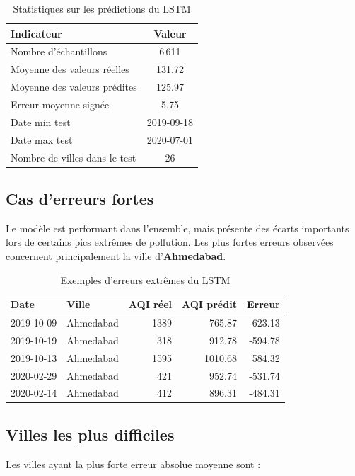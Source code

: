 \documentclass[11pt,a4paper]{article}
\begin{document}
\begin{table}[H]
\centering
\caption{Statistiques sur les prédictions du LSTM}
\begin{tabular}{lc}
\toprule
\textbf{Indicateur} & \textbf{Valeur} \\
\midrule
Nombre d'échantillons & 6\,611 \\
Moyenne des valeurs réelles & 131.72 \\
Moyenne des valeurs prédites & 125.97 \\
Erreur moyenne signée & 5.75 \\
Date min test & 2019-09-18 \\
Date max test & 2020-07-01 \\
Nombre de villes dans le test & 26 \\
\bottomrule
\end{tabular}
\end{table}

\subsection{Cas d'erreurs fortes}
Le modèle est performant dans l'ensemble, mais présente des écarts importants lors de certains pics extrêmes de pollution.
Les plus fortes erreurs observées concernent principalement la ville d'\textbf{Ahmedabad}.

\begin{table}[H]
\centering
\caption{Exemples d'erreurs extrêmes du LSTM}
\begin{tabular}{l l r r r}
\toprule
\textbf{Date} & \textbf{Ville} & \textbf{AQI réel} & \textbf{AQI prédit} & \textbf{Erreur} \\
\midrule
2019-10-09 & Ahmedabad & 1389 & 765.87 & 623.13 \\
2019-10-19 & Ahmedabad & 318 & 912.78 & -594.78 \\
2019-10-13 & Ahmedabad & 1595 & 1010.68 & 584.32 \\
2020-02-29 & Ahmedabad & 421 & 952.74 & -531.74 \\
2020-02-14 & Ahmedabad & 412 & 896.31 & -484.31 \\
\bottomrule
\end{tabular}
\end{table}

\subsection{Villes les plus difficiles}
Les villes ayant la plus forte erreur absolue moyenne sont :
\end{document}
